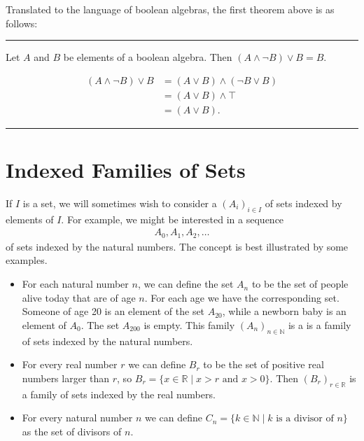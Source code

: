 \documentclass[letterpaper,10pt,english]{sphinxmanual}
\begin{document}
\sphinxAtStartPar
Translated to the language of boolean algebras, the first theorem above is as follows:


\bigskip\hrule\bigskip


\sphinxAtStartPar
{} Let \(A\) and \(B\) be elements of a boolean algebra. Then \((A \wedge \neg B) \vee B = B\).

\sphinxAtStartPar
{}
\begin{equation*}
\begin{split}(A \wedge \neg B) \vee B & = (A \vee B) \wedge (\neg B \vee B)
\\
& = (A \vee B) \wedge \top \\
& = (A \vee B).\end{split}
\end{equation*}

\bigskip\hrule\bigskip



\section{Indexed Families of Sets}
\label{\detokenize{sets:indexed-families-of-sets}}
\sphinxAtStartPar
If \(I\) is a set, we will sometimes wish to consider a  \((A_i)_{i \in I}\) of sets indexed by elements of \(I\). For example, we might be interested in a sequence
\begin{equation*}
\begin{split}A_0, A_1, A_2, \ldots\end{split}
\end{equation*}
\sphinxAtStartPar
of sets indexed by the natural numbers. The concept is best illustrated by some examples.
\begin{itemize}
\item {} 
\sphinxAtStartPar
For each natural number \(n\), we can define the set \(A_n\) to be the set of people alive today that are of age \(n\). For each age we have the corresponding set. Someone of age 20 is an element of the set \(A_{20}\), while a newborn baby is an element of \(A_0\). The set \(A_{200}\) is empty. This family \((A_n)_{n\in\mathbb{N}}\) is a is a family of sets indexed by the natural numbers.

\item {} 
\sphinxAtStartPar
For every real number \(r\) we can define \(B_r\) to be the set of positive real numbers larger than \(r\), so \(B_r = \{x\in \mathbb{R} \mid x > r \text{ and } x > 0\}\). Then \((B_r)_{r\in\mathbb{R}}\) is a family of sets indexed by the real numbers.

\item {} 
\sphinxAtStartPar
For every natural number \(n\) we can define \(C_n=\{k\in\mathbb{N} \mid k \text{ is a divisor of } n\}\) as the set of divisors of \(n\).

\end{itemize}
\end{document}
